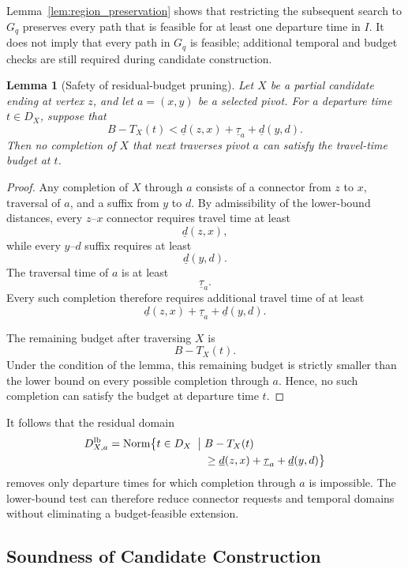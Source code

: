 \documentclass[a4paper,fleqn]{cas-dc}
\newtheorem{lemma}{Lemma}
\begin{document}
Lemma~\ref{lem:region_preservation} shows that restricting the subsequent
search to \(G_q\) preserves every path that is feasible for at least one
departure time in \(I\). It does not imply that every path in \(G_q\) is
feasible; additional temporal and budget checks are still required during
candidate construction.

\begin{lemma}[Safety of residual-budget pruning]
\label{lem:residual_pruning}
Let \(X\) be a partial candidate ending at vertex \(z\), and let
\(a=(x,y)\) be a selected pivot. For a departure time \(t\in D_X\), suppose
that
\[
B-T_X(t)
<
\underline d(z,x)
+
\underline{\tau}_a
+
\underline d(y,d).
\]
Then no completion of \(X\) that next traverses pivot \(a\) can satisfy the
travel-time budget at \(t\).
\end{lemma}

\begin{proof}
Any completion of \(X\) through \(a\) consists of a connector from \(z\) to
\(x\), traversal of \(a\), and a suffix from \(y\) to \(d\). By admissibility
of the lower-bound distances, every \(z\)--\(x\) connector requires travel
time at least
\[
\underline d(z,x),
\]
while every \(y\)--\(d\) suffix requires at least
\[
\underline d(y,d).
\]
The traversal time of \(a\) is at least
\[
\underline{\tau}_a.
\]
Every such completion therefore requires additional travel time of at least
\[
\underline d(z,x)
+
\underline{\tau}_a
+
\underline d(y,d).
\]

The remaining budget after traversing \(X\) is
\[
B-T_X(t).
\]
Under the condition of the lemma, this remaining budget is strictly smaller
than the lower bound on every possible completion through \(a\). Hence, no
such completion can satisfy the budget at departure time \(t\).
\end{proof}

It follows that the residual domain
\[
\begin{aligned}
D_{X,a}^{\mathrm{lb}}
=
\operatorname{Norm}\bigl\{t\in D_X\;\bigm|\;&
B-T_X(t)\\[-0.2ex]
&\geq \underline d(z,x)+\underline{\tau}_a+\underline d(y,d)
\bigr\}
\end{aligned}
\]
removes only departure times for which completion through \(a\) is impossible.
The lower-bound test can therefore reduce connector requests and temporal
domains without eliminating a budget-feasible extension.

\subsection{Soundness of Candidate Construction}
\label{subsec:analysis_construction}
\end{document}
